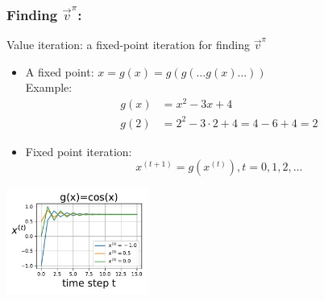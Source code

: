 \begin{frame}\frametitle{Finding $\vec v^\pi$:~\subsubsecname}

Value iteration: a fixed-point iteration for finding $\vec v^\pi$

\begin{itemize}
\item A fixed point: $x=g(x)=g(g(\ldots g(x)\ldots))$\\

Example:
\begin{align}
    g(x) &= x^{2} - 3x + 4\\
    g(2) &= 2^{2} - 3\cdot 2 + 4 = 4 - 6 + 4 = 2
\end{align}

\item Fixed point iteration:
\begin{equation}
x^{(t+1)} = g(x^{(t)}), t=0,1,2,\ldots
\end{equation}
\end{itemize}

\begin{center}
    \includegraphics[height=3.5cm]{img/fixed_point_iter_cos} 
\end{center}

\end{frame}


